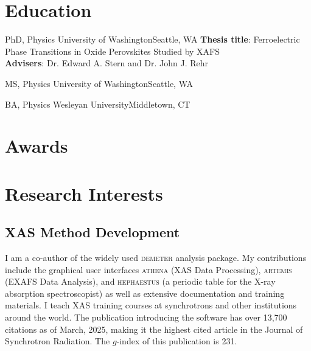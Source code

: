 \documentclass[11pt]{moderncv}
\begin{document}
\section{Education}
        {PhD, Physics}
        {University of Washington}{Seattle, WA}{}
        {\textbf{Thesis title}: Ferroelectric Phase Transitions in Oxide
          Perovskites Studied by XAFS\\
          \textbf{Advisers}: Dr. Edward A. Stern and Dr. John J. Rehr}  %

        {MS, Physics}
        {University of Washington}{Seattle, WA}{}{}

        {BA, Physics}
        {Wesleyan University}{Middletown, CT}{}{}

\pagebreak
\section{Awards}

        
\section{Research Interests}

\subsection{XAS Method Development}
%
{I am a co-author of the widely used \textsc{demeter} analysis
  package.  My contributions include the graphical user interfaces
  \textsc{athena} (XAS Data Processing), \textsc{artemis} (EXAFS Data
  Analysis), and \textsc{hephaestus} (a periodic table for the X-ray
  absorption spectroscopist) as well as extensive documentation and
  training materials.  I teach XAS training courses at synchrotrons
  and other institutions around the world. \newline{} The publication
  introducing the software has over 13,700 citations as of March,
  2025, making it the highest cited article in the Journal of
  Synchrotron Radiation.  The $g$-index of this publication is 231.}
\end{document}

